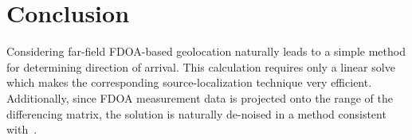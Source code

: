 \section*{Conclusion}
Considering far-field FDOA-based geolocation naturally leads to a simple method for determining direction of arrival. This calculation requires only a linear solve which makes the corresponding source-localization technique very efficient. Additionally, since FDOA measurement data is projected onto the range of the differencing matrix, the solution is naturally de-noised in a method consistent with~\cite{Schmidt1996,Compagnoni2017}.
